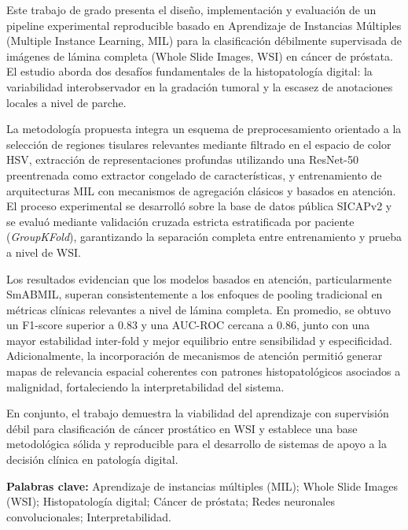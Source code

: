 Este trabajo de grado presenta el diseño, implementación y evaluación de un pipeline experimental reproducible basado en Aprendizaje de Instancias Múltiples (Multiple Instance Learning, MIL) para la clasificación débilmente supervisada de imágenes de lámina completa (Whole Slide Images, WSI) en cáncer de próstata. El estudio aborda dos desafíos fundamentales de la histopatología digital: la variabilidad interobservador en la gradación tumoral y la escasez de anotaciones locales a nivel de parche.\newline

La metodología propuesta integra un esquema de preprocesamiento orientado a la selección de regiones tisulares relevantes mediante filtrado en el espacio de color HSV, extracción de representaciones profundas utilizando una ResNet-50 preentrenada como extractor congelado de características, y entrenamiento de arquitecturas MIL con mecanismos de agregación clásicos y basados en atención. El proceso experimental se desarrolló sobre la base de datos pública SICAPv2 y se evaluó mediante validación cruzada estricta estratificada por paciente (\textit{GroupKFold}), garantizando la separación completa entre entrenamiento y prueba a nivel de WSI.\newline

Los resultados evidencian que los modelos basados en atención, particularmente SmABMIL, superan consistentemente a los enfoques de pooling tradicional en métricas clínicas relevantes a nivel de lámina completa. En promedio, se obtuvo un F1-score superior a 0.83 y una AUC-ROC cercana a 0.86, junto con una mayor estabilidad inter-fold y mejor equilibrio entre sensibilidad y especificidad. Adicionalmente, la incorporación de mecanismos de atención permitió generar mapas de relevancia espacial coherentes con patrones histopatológicos asociados a malignidad, fortaleciendo la interpretabilidad del sistema.\newline

En conjunto, el trabajo demuestra la viabilidad del aprendizaje con supervisión débil para clasificación de cáncer prostático en WSI y establece una base metodológica sólida y reproducible para el desarrollo de sistemas de apoyo a la decisión clínica en patología digital.

\medskip
\textbf{Palabras clave:} Aprendizaje de instancias múltiples (MIL); Whole Slide Images (WSI); Histopatología digital; Cáncer de próstata; Redes neuronales convolucionales; Interpretabilidad.
